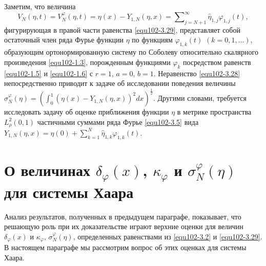 Заметим,  что величина
\begin{equation}\label{equ102-3.30}
 V_N(\eta,t)=V_N^\varphi(\eta,t)=\eta(x)- Y_{1,N}(\eta,x)
=\sum\nolimits_{j=N+1}^\infty \hat \eta_{1,j}\varphi_{1,j}(t),
\end{equation}
  фигурирующая в правой части равенства \eqref{equ102-3.29}, представляет собой остаточный член ряда Фурье функции $\eta$ по функциям $\varphi_{1,k}(t)$ $(k=0,1,\ldots)$, образующим ортонормированную систему по Соболеву относительно скалярного произведения \eqref{equ102-1.3}, порожденным  функциями $\varphi_k$ посредством равенств \eqref{equ102-1.5} и \eqref{equ102-1.6} с $r=1$, $a=0$, $b=1$.  Неравенство \eqref{equ102-3.28} непосредственно приводит к  задаче об исследовании поведения величины $\sigma_N^\varphi(\eta)=(\int_{0}^1(\eta(x)- Y_{1,N}(\eta,x))^2 dx)^\frac12$.
Другими словами, требуется исследовать задачу об оценке приближения функции $\eta$ в метрике пространства $L^2_{\rho}(0,1)$ частичными суммами   ряда Фурье \eqref{equ102-3.5} вида $Y_{1,N}(\eta,x)= \eta(0)+ \sum\nolimits_{k=1}^N \hat \eta_{1,k}\varphi_{1,k}(t).$

\section{О величинах $\delta_\varphi(x)$, $\kappa_\varphi$ и $\sigma_N^\varphi(\eta)$ для системы Хаара }

Анализ результатов, полученных в предыдущем параграфе, показывает, что решающую роль
при их доказательстве играют верхние оценки для величин $\delta_\varphi(x)$ и $\kappa_\varphi$, $\sigma_N^\varphi(\eta)$, определенных равенствами из \eqref{equ102-3.2} и \eqref{equ102-3.29}.  В настоящем параграфе мы рассмотрим вопрос об этих оценках для   системы Хаара.

